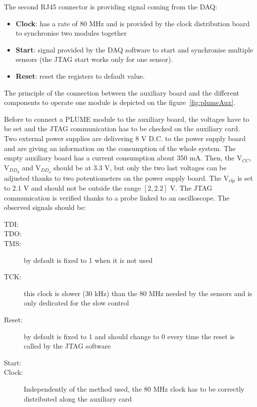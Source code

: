   The second RJ45 connector is providing signal coming from the DAQ:
  \begin{itemize}
    \item \textbf{Clock}: has a rate of 80 MHz and is provided by the clock distribution board to synchronise two modules together
    \item \textbf{Start}: signal provided by the DAQ software to start and synchronise multiple sensors (the JTAG start works only for one sensor).
    \item \textbf{Reset}: reset the registers to default value. 
  \end{itemize}

  The principle of the connection between the auxiliary board and the different components to operate one module is depicted on the figure~\ref{fig:plumeAux}.

  Before to connect a PLUME module to the auxiliary board, the voltages have to be set and the JTAG communication has to be checked on the auxiliary card.
  Two external power supplies are delivering 8 V D.C. to the power supply board and are giving an information on the consumption of the whole system.
  The empty auxiliary board has a current consumption about 350 mA.
  Then, the $\text{V}_{CC}$, $\text{V}_{DD_d}$ and $\text{V}_{DD_a}$ should be at 3.3 V, but only the two last voltages can be adjusted thanks to two potentiometers on the power supply board.
  The $\text{V}_{clp}$ is set to 2.1 V and should not be outside the range $\left[2, 2.2\right]$ V.
  The JTAG communication is verified thanks to a probe linked to an oscilloscope.
  The observed signals should be:

  \begin{description}
    \item[TDI:]
    \item[TDO:]
    \item[TMS:] by default is fixed to 1 when it is not used
    \item[TCK:] this clock is slower (30 kHz) than the 80 MHz needed by the sensors and is only dedicated for the slow control
    \item[Reset:] by default is fixed to 1 and should change to 0 every time the reset is called by the JTAG software
    \item[Start:] 
    \item[Clock:] Independently of the method used, the 80 MHz clock has to be correctly distributed along the auxiliary card
  \end{description}

